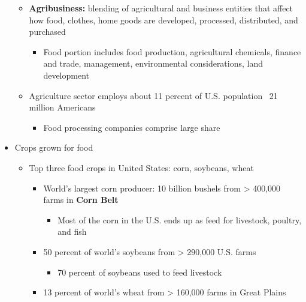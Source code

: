\documentclass[12pt]{article}
\begin{document}
\begin{itemize}
\begin{itemize}
                        \item \textbf{Agribusiness:} blending of agricultural and business entities that affect how food, clothes, home goods are developed, processed, distributed, and purchased
                            \begin{itemize}
                                \item Food portion includes food production, agricultural chemicals, finance and trade, management, environmental considerations, land development
                            \end{itemize}
                        \item Agriculture sector employs about 11 percent of U.S. population ~21 million Americans
                            \begin{itemize}
                                \item Food processing companies comprise large share
                            \end{itemize}
                    \end{itemize}
                \item Crops grown for food
                    \begin{itemize}
                        \item Top three food crops in United States: corn, soybeans, wheat
                            \begin{itemize}
                                \item World's largest corn producer: 10 billion bushels from > 400,000 farms in \textbf{Corn Belt}
                                    \begin{itemize}
                                        \item Most of the corn in the U.S. ends up as feed for livestock, poultry, and fish
                                    \end{itemize}
                                \item 50 percent of world's soybeans from > 290,000 U.S. farms
                                    \begin{itemize}
                                        \item 70 percent of soybeans used to feed livestock
                                    \end{itemize}
                                \item 13 percent of world's wheat from > 160,000 farms in Great Plains

\end{itemize}
\end{itemize}
\end{itemize}
\end{document}
